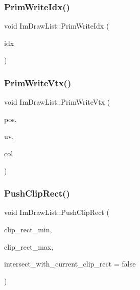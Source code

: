 \hypertarget{struct_im_draw_list_a42b72f87a0084c02f11dcd1560c8bbc7}{}\label{struct_im_draw_list_a42b72f87a0084c02f11dcd1560c8bbc7} 
\subsubsection{\texorpdfstring{Prim\+Write\+Idx()}{PrimWriteIdx()}}
{\footnotesize\ttfamily void Im\+Draw\+List\+::\+Prim\+Write\+Idx (\begin{DoxyParamCaption}\item[{Im\+Draw\+Idx}]{idx }\end{DoxyParamCaption})}

\hypertarget{struct_im_draw_list_af86de4faf6c8e978fb712ea14c5d0c5f}{}\label{struct_im_draw_list_af86de4faf6c8e978fb712ea14c5d0c5f} 
\subsubsection{\texorpdfstring{Prim\+Write\+Vtx()}{PrimWriteVtx()}}
{\footnotesize\ttfamily void Im\+Draw\+List\+::\+Prim\+Write\+Vtx (\begin{DoxyParamCaption}\item[{const \hyperlink{struct_im_vec2}{Im\+Vec2} \&}]{pos,  }\item[{const \hyperlink{struct_im_vec2}{Im\+Vec2} \&}]{uv,  }\item[{Im\+U32}]{col }\end{DoxyParamCaption})}

\hypertarget{struct_im_draw_list_acb34e2d3708616cae4567f3b4af06962}{}\label{struct_im_draw_list_acb34e2d3708616cae4567f3b4af06962} 
\subsubsection{\texorpdfstring{Push\+Clip\+Rect()}{PushClipRect()}}
{\footnotesize\ttfamily void Im\+Draw\+List\+::\+Push\+Clip\+Rect (\begin{DoxyParamCaption}\item[{\hyperlink{struct_im_vec2}{Im\+Vec2}}]{clip\+\_\+rect\+\_\+min,  }\item[{\hyperlink{struct_im_vec2}{Im\+Vec2}}]{clip\+\_\+rect\+\_\+max,  }\item[{bool}]{intersect\+\_\+with\+\_\+current\+\_\+clip\+\_\+rect = {\ttfamily false} }\end{DoxyParamCaption})}

